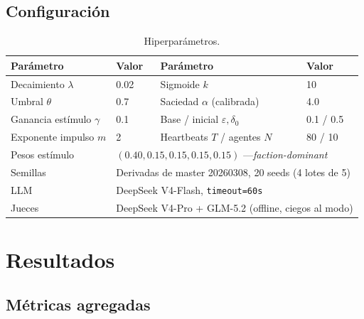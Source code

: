 \documentclass{llncs}
\begin{document}
\subsection{Configuraci\'on}

\begin{table}[H]
\caption{Hiperpar\'ametros.}\label{tab:hyperparams}
\centering\small
\begin{tabular}{|l|l|l|l|}
\hline
\textbf{Par\'ametro} & \textbf{Valor} & \textbf{Par\'ametro} & \textbf{Valor} \\
\hline
Decaimiento $\lambda$ & 0.02 & Sigmoide $k$ & 10 \\
Umbral $\theta$ & 0.7 & Saciedad $\alpha$ (calibrada) & 4.0 \\
Ganancia est\'imulo $\gamma$ & 0.1 & Base / inicial $\varepsilon,\delta_0$ & 0.1 / 0.5 \\
Exponente impulso $m$ & 2 & Heartbeats $T$ / agentes $N$ & 80 / 10 \\
Pesos est\'imulo & \multicolumn{3}{l|}{$(0.40, 0.15, 0.15, 0.15, 0.15)$ ---\emph{faction-dominant}} \\
Semillas & \multicolumn{3}{l|}{Derivadas de master 20260308, 20 seeds (4 lotes de 5)} \\
LLM & \multicolumn{3}{l|}{DeepSeek V4-Flash, \texttt{timeout=60s}} \\
Jueces & \multicolumn{3}{l|}{DeepSeek V4-Pro + GLM-5.2 (offline, ciegos al modo)} \\
\hline
\end{tabular}
\end{table}

\section{Resultados}
\label{sec:results}

\subsection{M\'etricas agregadas}
\end{document}
